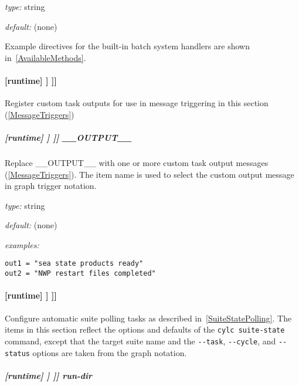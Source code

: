 \begin{myitemize}
\item {\em type:} string
\item {\em default:} (none)
\end{myitemize}

Example directives for the built-in batch system handlers are shown
in~\ref{AvailableMethods}.

\paragraph[{[[[}outputs{]]]}]{[runtime] \textrightarrow [[\_\_NAME\_\_]] \textrightarrow [[[outputs]]]}

Register custom task outputs for use in message triggering in this section
(\ref{MessageTriggers}) 

\subparagraph[\_\_OUTPUT\_\_ ]{[runtime] \textrightarrow [[\_\_NAME\_\_]] \textrightarrow [[[outputs]]] \textrightarrow \_\_OUTPUT\_\_}

Replace \_\_OUTPUT\_\_ with one or more custom task output messages
(\ref{MessageTriggers}).  The item name is used to select the custom output
message in graph trigger notation.
\begin{myitemize}
    \item {\em type:} string
    \item {\em default:} (none)
    \item{ \em examples:}
\end{myitemize}
\begin{lstlisting}
out1 = "sea state products ready"
out2 = "NWP restart files completed"
\end{lstlisting}

\paragraph[{[[[}suite state polling{]]]}]{[runtime] \textrightarrow [[\_\_NAME\_\_]] \textrightarrow [[[suite state polling]]]}

\lstset{language=transcript}
Configure automatic suite polling tasks as described
in~\ref{SuiteStatePolling}. The
items in this section reflect the options and defaults of the
\lstinline=cylc suite-state= command, except that the target suite name and the
\lstinline=--task=, \lstinline=--cycle=, and \lstinline=--status= options are
taken from the graph notation.

\subparagraph[run-dir]{[runtime] \textrightarrow [[\_\_NAME\_\_]] \textrightarrow [[[suite state polling]]] \textrightarrow run-dir}

